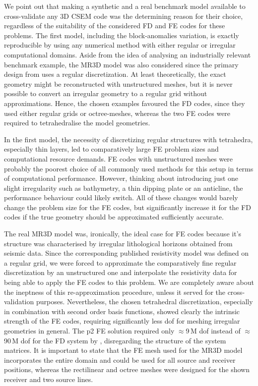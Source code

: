 \documentclass[
    paper,
  ]{geophysics}
\begin{document}
We point out that making a synthetic and a real benchmark model available to cross-validate any 3D CSEM code was the determining reason for their choice, regardless of the suitability of the considered FD and FE codes for these problems. The first model, including the block-anomalies variation, is exactly reproducible by using any numerical method with either regular or irregular computational domains. Aside from the idea of analysing an industrially relevant benchmark example, the MR3D model was also considered since the primary design from \cite{GEO.19.Correa} uses a regular discretization. At least theoretically, the exact geometry might be reconstructed with unstructured meshes, but it is never possible to convert an irregular geometry to a regular grid without approximations. Hence, the chosen examples favoured the FD codes, since they used either regular grids or octree-meshes, whereas the two FE codes were required to tetrahedralise the model geometries.

In the first model, the necessity of discretizing regular structures with tetrahedra, especially thin layers, led to comparatively large FE problem sizes and computational resource demands. FE codes with unstructured meshes were probably the poorest choice of all commonly used methods for this setup in terms of computational performance. However, thinking about introducing just one slight irregularity such as bathymetry, a thin dipping plate or an anticline, the performance behaviour could likely switch. All of these changes would barely change the problem size for the FE codes, but significantly increase it for the FD codes if the true geometry should be approximated sufficiently accurate.

The real MR3D model was, ironically, the ideal case for FE codes because it's structure was characterised by irregular lithological horizons obtained from seismic data. Since the corresponding published resistivity model was defined on a regular grid, we were forced to approximate the comparatively fine regular discretization by an unstructured one and interpolate the resistivity data for being able to apply the FE codes to this problem. We are completely aware about the ineptness of this re-approximation procedure, unless it served for the cross-validation purposes. Nevertheless, the chosen tetrahedral discretization, especially in combination with second order basis functions, showed clearly the intrinsic strength of the FE codes, requiring significantly less dof for meshing irregular geometries in general. The p2 FE solution required only $\approx$9\,M dof  instead of $\approx$90\,M dof for the FD system by \citet{GEO.19.Correa}, disregarding the structure of the system matrices. It is important to state that the FE mesh used for the MR3D model incorporates the entire domain and could be used for all source and receiver positions, whereas the rectilinear and octree meshes were designed for the shown receiver and two source lines.
\end{document}
